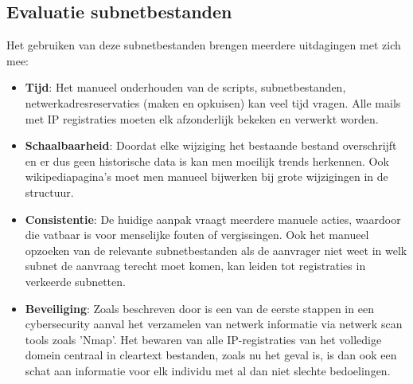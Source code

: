 \subsection{Evaluatie subnetbestanden}
Het gebruiken van deze subnetbestanden brengen meerdere uitdagingen met zich mee:
\begin{itemize}
    \item \textbf{Tijd}: Het manueel onderhouden van de scripts, subnetbestanden, netwerkadresreservaties (maken en opkuisen) kan veel tijd vragen. Alle mails met IP registraties moeten elk afzonderlijk bekeken en verwerkt worden.
    \item \textbf{Schaalbaarheid}: Doordat elke wijziging het bestaande bestand overschrijft en er dus geen historische data is kan men moeilijk trends herkennen. Ook wikipediapagina's moet men manueel bijwerken bij grote wijzigingen in de structuur.
    \item \textbf{Consistentie}: De huidige aanpak vraagt meerdere manuele acties, waardoor die vatbaar is voor menselijke fouten of vergissingen. Ook het manueel opzoeken van de relevante subnetbestanden als de aanvrager niet weet in welk subnet de aanvraag terecht moet komen, kan leiden tot registraties in verkeerde subnetten.  
    \item \textbf{Beveiliging}: Zoals beschreven door \textcite{Liao2020} is een van de eerste stappen in een cybersecurity aanval het verzamelen van netwerk informatie via netwerk scan tools zoals 'Nmap'. Het bewaren van alle IP-registraties van het volledige domein centraal in cleartext bestanden, zoals nu het geval is, is dan ook een schat aan informatie voor elk individu met al dan niet slechte bedoelingen.
\end{itemize}


